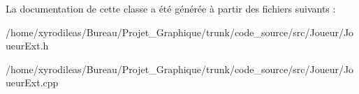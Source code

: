 La documentation de cette classe a été générée à partir des fichiers suivants \-:\begin{DoxyCompactItemize}
\item 
/home/xyrodileas/\-Bureau/\-Projet\-\_\-\-Graphique/trunk/code\-\_\-source/src/\-Joueur/Joueur\-Ext.\-h\item 
/home/xyrodileas/\-Bureau/\-Projet\-\_\-\-Graphique/trunk/code\-\_\-source/src/\-Joueur/Joueur\-Ext.\-cpp\end{DoxyCompactItemize}
